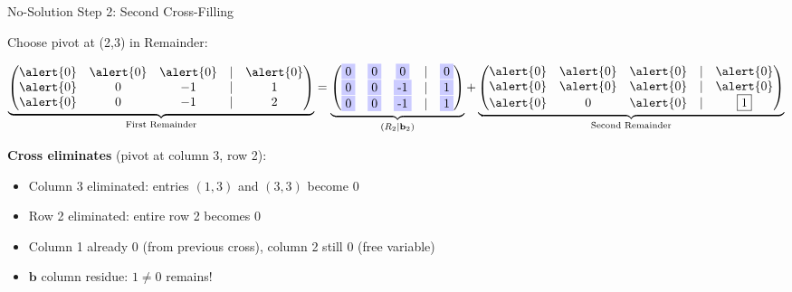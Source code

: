 \documentclass[10pt]{beamer}
\theoremstyle{definition}
\newcommand{\x}[1]{\alert{\textbf{#1}}}
\begin{document}
\begin{frame}[fragile]{No-Solution Step 2: Second Cross-Filling}

Choose pivot at (2,3) in Remainder:

$$\underbrace{\begin{pmatrix}
\alert{0} & \alert{0} & \alert{0} & | & \alert{0} \\
\alert{0} & 0 & -1 & | & 1 \\
\alert{0} & 0 & -1 & | & 2
\end{pmatrix}}_{\text{First Remainder}} = \underbrace{\begin{pmatrix}
\colorbox{blue!20}{0} & \colorbox{blue!20}{0} & \colorbox{blue!20}{0} & | & \colorbox{blue!20}{0} \\
\colorbox{blue!20}{0} & \colorbox{blue!20}{0} & \colorbox{blue!20}{-1} & | & \colorbox{blue!20}{1} \\
\colorbox{blue!20}{0} & \colorbox{blue!20}{0} & \colorbox{blue!20}{-1} & | & \colorbox{blue!20}{1}
\end{pmatrix}}_{(R_2 \mid \mathbf{b}_2)} + \underbrace{\begin{pmatrix}
\alert{0} & \alert{0} & \alert{0} & | & \alert{0} \\
\alert{0} & \alert{0} & \alert{0} & | & \alert{0} \\
\alert{0} & 0 & \alert{0} & | & \boxed{1}
\end{pmatrix}}_{\text{Second Remainder}}$$

\vspace{0.5em}

\x{Cross eliminates} (pivot at column 3, row 2):
\begin{itemize}
\item \alert{Column 3} eliminated: entries $(1,3)$ and $(3,3)$ become 0
\item \alert{Row 2} eliminated: entire row 2 becomes 0
\item Column 1 already 0 (from previous cross), column 2 still 0 (free variable)
\item \alert{$\mathbf{b}$ column residue}: $\boxed{1} \neq 0$ remains!
\end{itemize}

\end{frame}
\end{document}
